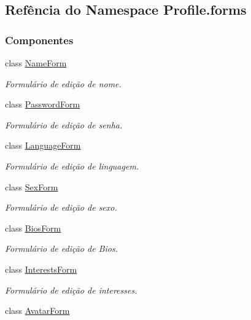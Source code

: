 \hypertarget{namespaceProfile_1_1forms}{\subsection{Refência do Namespace Profile.\-forms}
\label{namespaceProfile_1_1forms}
}
\subsubsection*{Componentes}
\begin{DoxyCompactItemize}
\item 
class \hyperlink{classProfile_1_1forms_1_1NameForm}{Name\-Form}
\begin{DoxyCompactList}\small\item\em Formulário de edição de nome. \end{DoxyCompactList}\item 
class \hyperlink{classProfile_1_1forms_1_1PasswordForm}{Password\-Form}
\begin{DoxyCompactList}\small\item\em Formulário de edição de senha. \end{DoxyCompactList}\item 
class \hyperlink{classProfile_1_1forms_1_1LanguageForm}{Language\-Form}
\begin{DoxyCompactList}\small\item\em Formulário de edição de linguagem. \end{DoxyCompactList}\item 
class \hyperlink{classProfile_1_1forms_1_1SexForm}{Sex\-Form}
\begin{DoxyCompactList}\small\item\em Formulário de edição de sexo. \end{DoxyCompactList}\item 
class \hyperlink{classProfile_1_1forms_1_1BiosForm}{Bios\-Form}
\begin{DoxyCompactList}\small\item\em Formulário de edição de Bios. \end{DoxyCompactList}\item 
class \hyperlink{classProfile_1_1forms_1_1InterestsForm}{Interests\-Form}
\begin{DoxyCompactList}\small\item\em Formulário de edição de interesses. \end{DoxyCompactList}\item 
class \hyperlink{classProfile_1_1forms_1_1AvatarForm}{Avatar\-Form}
\end{DoxyCompactItemize}
